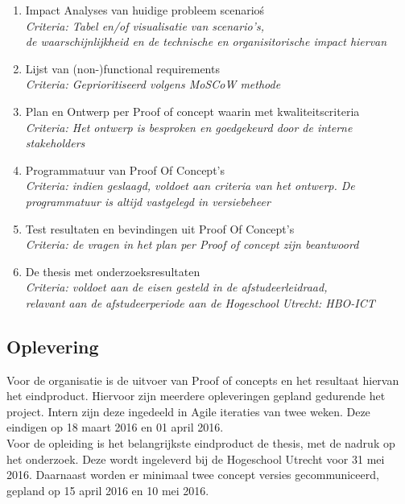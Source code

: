 \begin{enumerate}
\item Impact Analyses van huidige probleem scenario\'s \\
      \textit{Criteria: Tabel en/of visualisatie van scenario's, \\de waarschijnlijkheid en de technische en organisitorische impact hiervan }
\item Lijst van (non-)functional requirements \\
      \textit{Criteria: Geprioritiseerd volgens MoSCoW methode}
\item Plan en Ontwerp per Proof of concept waarin met kwaliteitscriteria \\
      \textit{Criteria: Het ontwerp is besproken en goedgekeurd door de interne stakeholders}
\item Programmatuur van Proof Of Concept's \\
        \textit{Criteria: indien geslaagd, voldoet aan criteria van het ontwerp. De programmatuur is altijd vastgelegd in versiebeheer}
\item Test resultaten en bevindingen uit Proof Of Concept's \\
        \textit{Criteria: de vragen in het plan per Proof of concept zijn beantwoord}
\item De thesis met onderzoeksresultaten \\
    \textit{Criteria: voldoet aan de eisen gesteld in de afstudeerleidraad, \\
    relavant aan de afstudeerperiode aan de Hogeschool Utrecht: HBO-ICT}
\end{enumerate}

    \subsection{Oplevering}
    
    Voor de organisatie is de uitvoer van Proof of concepts en het resultaat hiervan het eindproduct. Hiervoor zijn meerdere opleveringen gepland gedurende het project. Intern zijn deze ingedeeld in Agile iteraties van twee weken. Deze eindigen op 18 maart 2016 en 01 april 2016. \\
    
    Voor de opleiding is het belangrijkste eindproduct de thesis, met de nadruk op het onderzoek. Deze wordt ingeleverd bij de Hogeschool Utrecht voor 31 mei 2016. Daarnaast worden er minimaal twee concept versies gecommuniceerd, gepland op 15 april 2016 en 10 mei 2016.
    
